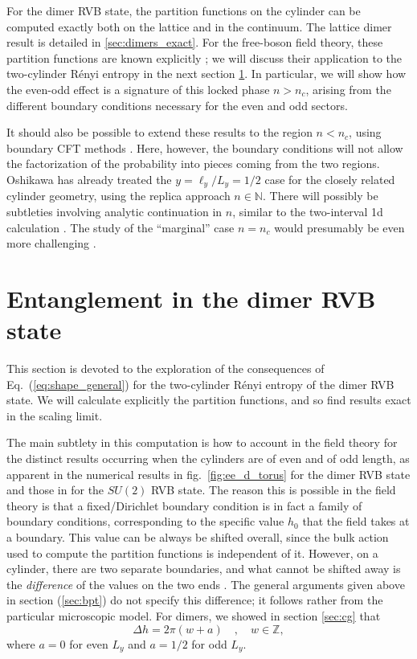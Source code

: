 \documentclass[11pt]{iopart}
\begin{document}
For the dimer RVB state, the partition functions on the cylinder can be computed exactly both on the lattice and in the continuum.  The lattice dimer result is detailed in \ref{sec:dimers_exact}. For the free-boson field theory, these partition functions are known explicitly \cite{BigYellowBook};  we will discuss their application to the two-cylinder R\'enyi entropy in the next section \ref{sec:dimers_entanglement}. In particular, we will show how the even-odd effect is a signature of this locked phase  $n>n_c$, arising from the different boundary conditions necessary for the even and odd sectors.


It should also be possible to extend these results to the region $n<n_c$, using boundary CFT methods \cite{Shannonee,Oshikawa,Zaletel,Stephan2011}. Here, however, the boundary conditions will not allow the factorization of the probability into pieces coming from the two regions. Oshikawa\cite{Oshikawa} has already treated the $y=\ell_y/L_y=1/2$ case for the closely related cylinder geometry, using the replica approach $n\in \mathbb{N}$. There will possibly be subtleties involving analytic continuation in $n$, similar to the two-interval 1d calculation \cite{CCT1,CCT2}. The study of the ``marginal'' case $n=n_c$ would presumably be even more challenging \cite{Stephan2010,Stephan2011}.


\section{Entanglement in the dimer RVB state}
\label{sec:dimers_entanglement}

This section is devoted to the exploration of the consequences of Eq.~(\ref{eq:shape_general}) for the two-cylinder R\'enyi entropy of the dimer RVB state. We will calculate explicitly the partition functions, and so find results exact in the scaling limit. 

The main subtlety in this computation is how to account in the field theory for the distinct results occurring when the cylinders are of even and of odd length, as apparent in the numerical results in fig.\ \ref{fig:ee_d_torus} for the dimer RVB state and those in \cite{Ju2012} for the $SU(2)$ RVB state. The reason this is possible in the field theory is that a fixed/Dirichlet boundary condition is in fact a family of boundary conditions, corresponding to the specific value $h_0$ that the field takes at a boundary. This value can be always be shifted overall, since the bulk action used to compute the partition functions is independent of it. However, on a cylinder, there are two separate boundaries, and what cannot be shifted away is the {\em difference} of the values on the two ends \cite{OshikawaAffleck1,OshikawaAffleck2}.    
The general arguments given above in section (\ref{sec:bpt}) do not specify this difference; it follows rather from the particular microscopic model. For dimers, we showed in section \ref{sec:cg} that 
\begin{equation}
 \Delta h =2\pi (w+a)\quad,\quad w \in \mathbb{Z},
\end{equation}
where $a=0$ for even $L_y$ and $a=1/2$ for odd $L_y$. 
\end{document}
